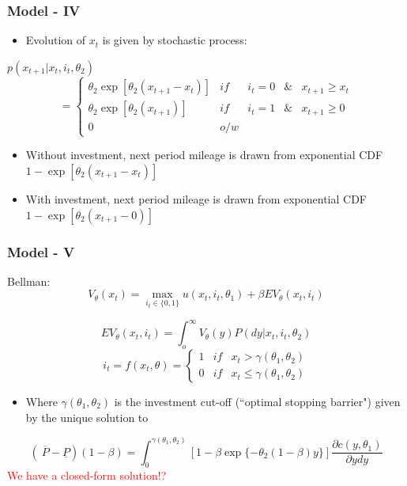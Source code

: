 \documentclass{beamer}
\begin{document}
\begin{frame}
\frametitle{Model - IV}
\begin{itemize}
\item  Evolution of $x_t$ is given by stochastic process: 
\end{itemize}
$p(x_{t+1}|x_t,i_t,\theta_2)$
\[=\left\{\begin{array}{lcccc} \theta_2 \exp[\theta_2(x_{t+1}-x_t)] & if & i_t=0& \&& x_{t+1}\geq x_t\\
\theta_2 \exp[\theta_2(x_{t+1})]& if & i_t=1&\&&x_{t+1}\geq0\\
0 &o/w&&&  \end{array}\right.\]
\begin{itemize}
\item Without investment, next period mileage is drawn from exponential CDF $1-\exp[\theta_2(x_{t+1}-x_{t})]$  
\bigskip
\item With investment, next period mileage is drawn from exponential CDF $1-\exp[\theta_2(x_{t+1}-0)]$  
\end{itemize}
\end{frame}

\begin{frame}
\frametitle{Model - V}
 Bellman:
\[V_{\theta}(x_t)=\max_{i_t\in \{0,1\}}u(x_t,i_t,\theta_1)+\beta EV_{\theta}(x_t,i_t)\]

\[EV_{\theta}(x_t,i_t)=\int_o^\infty V_{\theta}(y)P(dy|x_t,i_t,\theta_2)\]
\[i_t=f(x_t,\theta)=\left\{\begin{array}{lcc}1 & if & x_t>\gamma(\theta_1,\theta_2)\\ 0 & if&x_t\leq \gamma(\theta_1,\theta_2)\end{array}\right.\]
\begin{itemize}
\item Where $\gamma(\theta_1,\theta_2)$ is the investment cut-off (``optimal stopping barrier") given by the unique solution to 
\end{itemize}
\[ ( \ \overline{P} - \underline{P})(1-\beta)=\int_0^{\gamma(\theta_1,\theta_2)}[1-\beta\exp\{-\theta_2(1-\beta)y\}]\frac{\partial c(y,\theta_1)}{\partial y dy}\]
\textcolor{red}{We have a closed-form solution!?}
 \end{frame}
\end{document}
